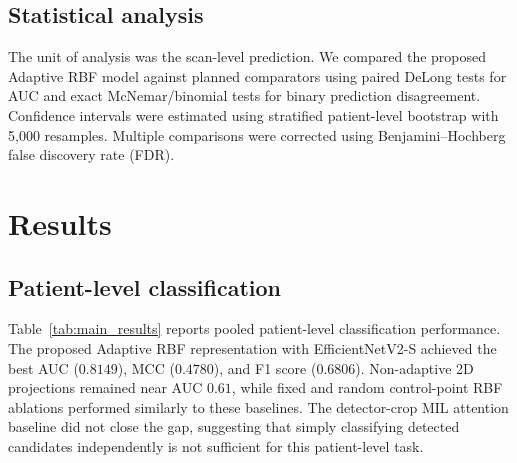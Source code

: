 \documentclass[preprint,12pt]{elsarticle}
\begin{document}
\subsection{Statistical analysis}

The unit of analysis was the scan-level prediction. We compared the proposed Adaptive RBF model against planned comparators using paired DeLong tests for AUC and exact McNemar/binomial tests for binary prediction disagreement. Confidence intervals were estimated using stratified patient-level bootstrap with 5,000 resamples. Multiple comparisons were corrected using Benjamini--Hochberg false discovery rate (FDR).

\section{Results}

\subsection{Patient-level classification}

Table~\ref{tab:main_results} reports pooled patient-level classification performance. The proposed Adaptive RBF representation with EfficientNetV2-S achieved the best AUC ($0.8149$), MCC ($0.4780$), and F1 score ($0.6806$). Non-adaptive 2D projections remained near AUC $0.61$, while fixed and random control-point RBF ablations performed similarly to these baselines. The detector-crop MIL attention baseline did not close the gap, suggesting that simply classifying detected candidates independently is not sufficient for this patient-level task.

\begin{table}[t]
\centering
\caption{Pooled patient-level classification results over the 10 LUNA16 test folds. All methods use EfficientNetV2-S unless otherwise noted.}
\label{tab:main_results}
\end{table}
\end{document}
